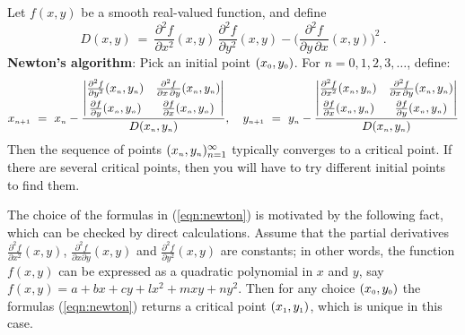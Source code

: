 Let $f(x,y)$ be a smooth real-valued function, and define
\begin{displaymath}
 D(x,y) ~=~ \dfrac{\partial^2 f}{\partial x^2}(x,y) \, \dfrac{\partial^2 f}{\partial y^2}(x,y) -
 \biggl( \dfrac{\partial^2 f}{\partial y \, \partial x}(x,y) \biggr)^2 ~.
\end{displaymath}
\textbf{Newton's algorithm}: Pick an initial point $(x_{\scriptscriptstyle 0},y_{\scriptscriptstyle 0})$. For $n = 0, 1, 2, 3, \dots$,
define:
\begin{equation}\label{eqn:newton}
 \ssub{x}{n+1} ~=~ \ssub{x}{n} -
  \frac{
    \begin{vmatrix}
     \frac{\partial^2 f}{\partial y^2}(\ssub{x}{n},\ssub{y}{n}) &
     \frac{\partial^2 f}{\partial x \, \partial y}(\ssub{x}{n},\ssub{y}{n})\vspace{1mm}\\
     \frac{\partial f}{\partial y}(\ssub{x}{n},\ssub{y}{n}) &
     \frac{\partial f}{\partial x}(\ssub{x}{n},\ssub{y}{n})
    \end{vmatrix}}{D(\ssub{x}{n},\ssub{y}{n})} ,\quad
 \ssub{y}{n+1} ~=~ \ssub{y}{n} -
  \frac{
    \begin{vmatrix}
     \frac{\partial^2 f}{\partial x^2}(\ssub{x}{n},\ssub{y}{n}) &
     \frac{\partial^2 f}{\partial x \, \partial y}(\ssub{x}{n},\ssub{y}{n})\vspace{1mm}\\
     \frac{\partial f}{\partial x}(\ssub{x}{n},\ssub{y}{n}) &
     \frac{\partial f}{\partial y}(\ssub{x}{n},\ssub{y}{n})
    \end{vmatrix}}{D(\ssub{x}{n},\ssub{y}{n})}
\end{equation}
Then the sequence of points $(x_{\scriptscriptstyle n},y_{\scriptscriptstyle n})_{n=1}^{\infty}$ typically converges to a critical point. 
If there are several critical points, then you will have to try different initial points to find them.

The choice of the formulas in (\ref{eqn:newton}) is motivated by the following fact, which can be checked by direct calculations.
Assume that the partial derivatives $\tfrac{\partial^2 f}{\partial x^2}(x,y)$, $\tfrac{\partial^2 f}{\partial x\partial y}(x,y)$ and $\tfrac{\partial^2 f}{\partial y^2}(x,y)$ are constants;
in other words, the function $f(x,y)$ can be expressed as a quadratic polynomial in $x$ and $y$, say $f(x,y)=a+bx+cy+lx^2+mxy+ny^2$.
Then for any choice $(x_{\scriptscriptstyle 0},y_{\scriptscriptstyle 0})$ the formulas (\ref{eqn:newton}) returns a critical point $(x_{\scriptscriptstyle 1},y_{\scriptscriptstyle 1})$, which is unique in this case.

